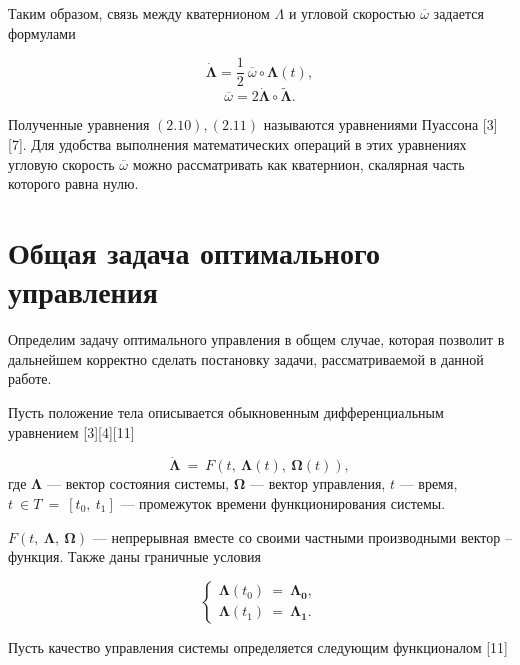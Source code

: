 \documentclass[14pt]{extreport}
\begin{document}
Таким образом, связь между кватернионом $\Lambda$ и угловой скоростью $\overline{\omega}$ задается формулами

\begin{equation}
\boldsymbol{\dot{\Lambda}} = \dfrac{1}{2}\ \overline{\omega} \circ \boldsymbol\Lambda(t),
\end{equation}
\begin{equation}
\overline{\omega} = 2\boldsymbol{\dot{\Lambda}} \circ \boldsymbol{\widetilde{\Lambda}}.
\end{equation}

Полученные уравнения $(2.10), (2.11)$ называются уравнениями Пуассона [3][7]. Для удобства выполнения математических операций
в этих уравнениях угловую скорость $\overline{\omega}$ можно рассматривать как кватернион, скалярная часть которого равна нулю. 

\newpage

\chapter{Общая задача оптимального управления}

Определим задачу оптимального управления в общем случае, которая позволит в дальнейшем корректно сделать постановку задачи, рассматриваемой в данной работе.

Пусть положение тела описывается обыкновенным дифференциальным уравнением [3][4][11]

\begin{equation}
 \boldsymbol{\dot{\Lambda}}\ =\ F(t,\ \boldsymbol{\Lambda}(t),\ \boldsymbol\Omega(t)), 
\end{equation}
где $\boldsymbol\Lambda$ --- вектор состояния системы, $\boldsymbol\Omega$ --- вектор управления, $t$ --- время, $t\ \in T\ =\ [t_0,\ t_1]$ --- промежуток времени
функционирования системы.

$F(t,\ \boldsymbol\Lambda,\ \boldsymbol\Omega)$ --- непрерывная вместе со своими частными производными вектор -- функция. Также даны граничные условия

\begin{equation}
\begin{cases}
\boldsymbol\Lambda(t_0)\ =\ \boldsymbol{\Lambda_0}, \\
\boldsymbol\Lambda(t_1)\ =\ \boldsymbol{\Lambda_1}.
 \end{cases}
\end{equation}

Пусть качество управления системы определяется следующим функционалом [11]
\end{document}
